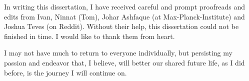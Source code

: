 \begin{acknowledgments}
In writing this dissertation, I have received careful and prompt proofreads and edits from Ivan, Ninnat (Tom), Johar Ashfaque (at Max-Planck-Institute) and Joshua Teves (on Reddit).
Without their help, this dissertation could not be finished in time. I would like to thank them from heart.

I may not have much to return to everyone individually, but persisting my passion and endeavor that, I believe, will better our shared future life, as I did before, is the journey I will continue on.
\end{acknowledgments} 